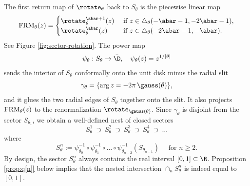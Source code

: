 \documentclass{amsart}
\begin{document}
The first return map of $\rotate_{\theta}$ back to $S_{\theta}$ is the piecewise linear map
\[
    \textnormal{FRM}_{\theta}(z) = \begin{cases}
        \rotate_{\theta}^{\abar+1}(z) & \text{ if } z \in \triangle_{\theta}(-\abar-1,-2\abar-1) , \\
        \rotate_{\theta}^{\abar}(z) & \text{ if } z \in \triangle_{\theta}(-2\abar-1,-\abar) .
    \end{cases}
\]
See Figure \ref{fig:sector-rotation}.
The power map 
\[
    \psi_{\theta}: S_{\theta} \to \bar{\D}, \quad \psi_\theta(z) = z^{1/|\theta|}
\]
sends the interior of $S_{\theta}$ conformally onto the unit disk minus the radial slit 
\[
\gamma_\theta = \{ \arg z = - 2\pi \, \gauss(\theta) \},
\]
and it glues the two radial edges of $S_{\theta}$ together onto the slit. 
It also projects $\textnormal{FRM}_{\theta}(z)$ to the renormalization $\rotate_{\gauss(\theta)}$.
Since $\gamma_{\theta}$ is disjoint from the sector $S_{\theta_1}$, we obtain a well-defined nest of closed sectors 
\[
S_{\theta}^1 \ \supset \ S_{\theta}^2 \ \supset \ 
S_{\theta}^3 \ \supset \ S_{\theta}^4 \ \supset \ \ldots
\]
where 
    \[
    S_{\theta}^n := \psi_{\theta_0}^{-1} \circ \psi_{\theta_1}^{-1} \circ \ldots \circ \psi_{\theta_{n-2}}^{-1}(S_{\theta_{n-1}})
    \quad \text{ for } n\geq 2.
    \]
By design, the sector $S_{\theta}^n$ always contains the real interval $[0,1] \subset \R$.
Proposition \ref{prop:q[n]} below implies that the nested intersection $\cap_n S_{\theta}^n$ is indeed equal to $[0,1]$.
\end{document}
